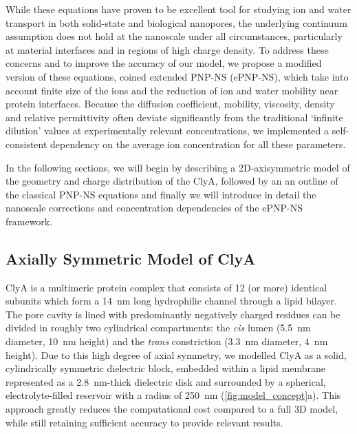 \documentclass[journal=ancac3, manuscript=article, etalmode=truncate,maxauthors=0]{achemso}
\begin{document}
While these equations have proven to be excellent tool for studying ion and water transport in both 
solid-state\cite{daiguji2004,lu2012,chaudhry2014,rempfer2016,lin2016} and biological 
nanopores,\cite{eisenberg1996,simakov2010,pederson2015} the underlying continuum assumption does not hold at 
the nanoscale under all circumstances, particularly at material interfaces\cite{vo2016} and in regions of 
high charge density.\cite{corry2000} To address these concerns and to improve the accuracy of our model, we 
propose a modified version of these equations, coined extended PNP-NS (ePNP-NS), which take into account 
finite size of the ions\cite{borukhov1997,lu2011} and the reduction of ion and water mobility near protein 
interfaces.\cite{makarov1998, pronk2013} Because the diffusion coefficient, mobility, viscosity, 
density\cite{} and relative permittivity\cite{gavish2016} often deviate significantly from the traditional 
`infinite dilution' values at experimentally relevant concentrations, we implemented a self-consistent 
dependency on the average ion concentration for all these parameters.

In the following sections, we will begin by describing a 2D-axisymmetric model of the geometry and charge 
distribution of the ClyA, followed by an an outline of the classical PNP-NS equations and finally we will 
introduce in detail the nanoscale corrections and concentration dependencies of the ePNP-NS framework.


\subsection{Axially Symmetric Model of ClyA}

ClyA is a multimeric protein complex that consists of 12 (or more) identical subunits which form a 
\SI{14}{\nano\meter} long hydrophilic channel through a lipid bilayer. The pore cavity is lined with 
predominantly negatively charged residues can be divided in roughly two cylindrical compartments: the 
\textit{cis} lumen (\SI{5.5}{\nano\meter} diameter, \SI{10}{\nano\meter} height) and the \textit{trans} 
constriction (\SI{3.3}{\nano\meter} diameter, \SI{4}{\nano\meter} height). Due to this high degree of axial 
symmetry, we modelled ClyA as a solid, cylindrically symmetric dielectric block, embedded within a lipid 
membrane represented as a \SI{2.8}{\nano\meter}-thick\cite{kucerka2011} dielectric disk  and surrounded by a 
spherical, electrolyte-filled reservoir with a radius of \SI{250}{\nano\meter} 
(\cref{fig:model_concept}a).\cite{lu2012,pederson2015} This approach greatly reduces the computational cost 
compared to a full 3D model, while still retaining sufficient accuracy to provide relevant results. 
\end{document}
